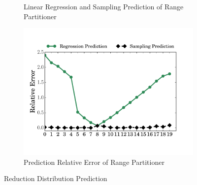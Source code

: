 \begin{figure}
\begin{subfigure}[b]{0.31\linewidth}
		\caption{Linear Regression and Sampling Prediction of Range Partitioner}
		\label{fig:range_pre_sample}
	\end{subfigure}
	\begin{subfigure}[b]{0.31\linewidth}
		\includegraphics[width=\linewidth]{fig/prediction_relative_error}
		\caption{Prediction Relative Error of Range Partitioner\newline}
		\label{fig:prediction_relative_error}
	\end{subfigure}
	\caption{Reduction Distribution Prediction}
	\label{fig:dis}
	\vspace{-1em}
\end{figure}

